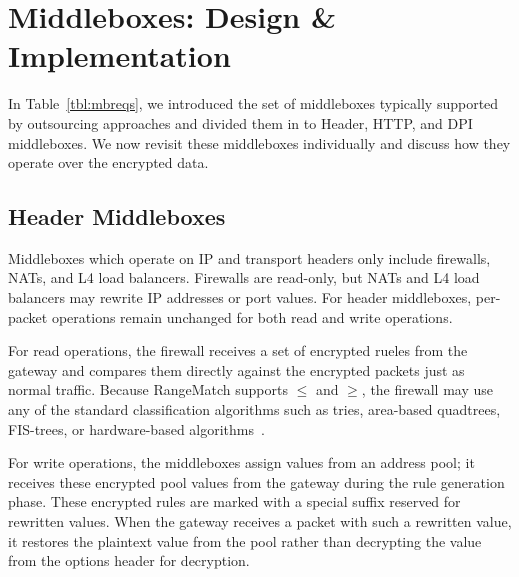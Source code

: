 \section{Middleboxes: Design \& Implementation}
\label{sec:mbs}

In Table~\ref{tbl:mbreqs}, we introduced the set of middleboxes typically supported by outsourcing approaches and divided them in to Header, HTTP, and DPI middleboxes. 
We now revisit these middleboxes individually and discuss how they operate over the encrypted data.


\subsection{Header Middleboxes}
Middleboxes which operate on IP and transport headers only include firewalls, NATs, and L4 load balancers.
Firewalls are read-only, but NATs and L4 load balancers may rewrite IP addresses or port values. 
For header middleboxes, per-packet operations remain unchanged for both read and write operations.

For read operations, the firewall receives a set of encrypted rueles from the gateway and compares them directly against the encrypted packets just as normal traffic. Because RangeMatch supports $\leq$ and $\geq$, the firewall may use any of the standard classification algorithms such as tries, area-based quadtrees, FIS-trees, or hardware-based algorithms~\cite{packet_classif}.

For write operations, the middleboxes assign values from an address pool; it receives these encrypted pool values from the gateway during the rule generation phase.
These encrypted rules are marked with a special suffix reserved for rewritten values.
When the gateway receives a packet with such a rewritten value, it restores the plaintext value from the pool rather than decrypting the value from the options header for decryption.

